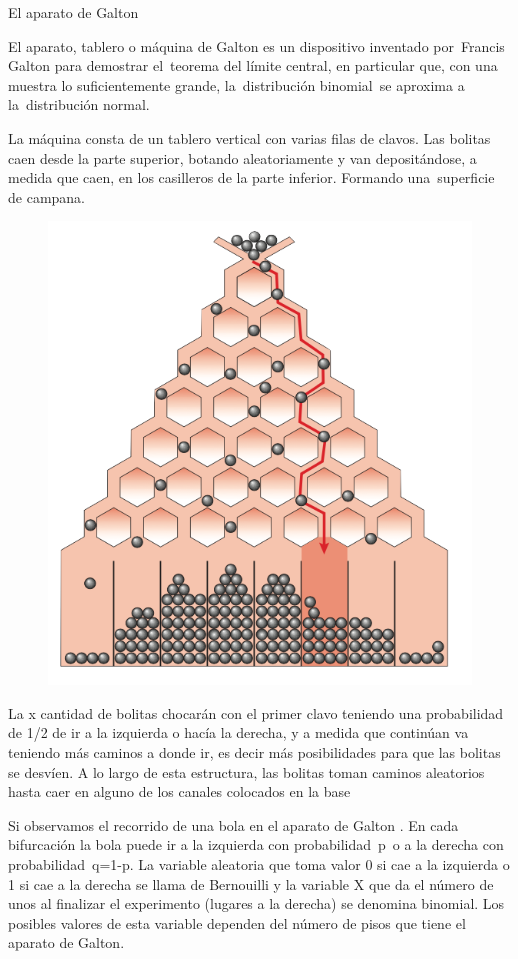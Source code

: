 \vspace{5mm} %
\begin{myexampleblock}{El aparato de Galton}

El aparato, tablero  o máquina de Galton es un dispositivo inventado por Francis Galton para demostrar el teorema del límite central, en particular que, con una muestra lo suficientemente grande, la distribución binomial se aproxima a la distribución normal.

\vspace{2mm} La máquina consta de un tablero vertical con varias filas de clavos. Las bolitas caen desde la parte superior, botando aleatoriamente y van depositándose, a medida que caen, en los casilleros de la parte inferior. Formando una superficie de campana.

	\begin{figure}[H]
	\centering
	\includegraphics[width=.6\textwidth]{imagenes/imagenes04/T04IM40.png}
	\end{figure}

\vspace{2mm} La x cantidad de bolitas chocarán con el primer clavo teniendo una probabilidad de 1/2 de ir a la izquierda o hacía la derecha, y a medida que continúan va teniendo más caminos a donde ir, es decir más posibilidades para que las bolitas se desvíen. A lo largo de esta estructura, las bolitas toman caminos aleatorios hasta caer en alguno de los canales colocados en la base

\vspace{2mm} Si observamos el recorrido de una bola en el aparato de Galton . En cada bifurcación la bola puede ir a la izquierda con probabilidad p o a la derecha con probabilidad q=1-p. La variable aleatoria que toma valor 0 si cae a la izquierda o 1 si cae a la derecha se llama de Bernouilli y la variable X que da el número de unos al finalizar el experimento (lugares a la derecha) se denomina binomial. Los posibles valores de esta variable dependen del número de pisos que tiene el aparato de Galton.


\end{myexampleblock}
